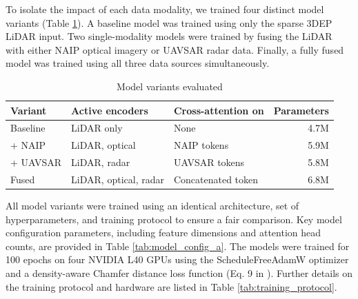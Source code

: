 \documentclass[remotesensing,article,submit,pdftex,moreauthors]{Definitions/mdpi}
\begin{document}
To isolate the impact of each data modality, we trained four distinct model variants (Table \ref{tab:model_variants}). A baseline model was trained using only the sparse 3DEP LiDAR input. Two single-modality models were trained by fusing the LiDAR with either NAIP optical imagery or UAVSAR radar data. Finally, a fully fused model was trained using all three data sources simultaneously. 
\begin{table}[htbp]
  \centering
  \caption{Model variants evaluated}
  \label{tab:model_variants}
  \begin{tabular}{lllr}
  \toprule
  \textbf{Variant} & \textbf{Active encoders} & \textbf{Cross-attention on} & \textbf{Parameters} \\
  \midrule
 Baseline & LiDAR only & None  & 4.7M \\
  + NAIP & LiDAR, optical  & NAIP tokens & 5.9M \\
  + UAVSAR & LiDAR, radar & UAVSAR tokens  & 5.8M \\
  Fused  & LiDAR, optical, radar & Concatenated token  & 6.8M \\
  \bottomrule
  \end{tabular}
\end{table}

All model variants were trained using an identical architecture, set of hyperparameters, and training protocol to ensure a fair comparison. Key model configuration parameters, including feature dimensions and attention head counts, are provided in Table \ref{tab:model_config_a}. The models were trained for 100 epochs on four NVIDIA L40 GPUs using the ScheduleFreeAdamW optimizer \cite{defazio_road_2024} and a density-aware Chamfer distance loss function (Eq. 9 in \cite{wu_density-aware_2021}). Further details on the training protocol and hardware are listed in Table \ref{tab:training_protocol}.
\end{document}
